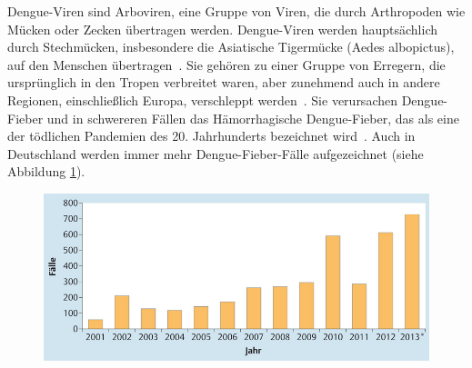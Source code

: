 \documentclass[german,version-2022-01]{uzl-thesis}
\begin{document}
Dengue-Viren sind Arboviren, eine Gruppe von Viren, die durch Arthropoden wie M\"ucken oder Zecken \"ubertragen werden. Dengue-Viren werden haupts\"achlich durch Stechm\"ucken, insbesondere die Asiatische Tigerm\"ucke (Aedes albopictus), auf den Menschen \"ubertragen~\cite{cramer_dengue-virus_2014}. Sie geh\"oren zu einer Gruppe von Erregern, die urspr\"unglich in den Tropen verbreitet waren, aber zunehmend auch in andere Regionen, einschlie\ss{}lich Europa, verschleppt werden~\cite{cramer_dengue-virus_2014}. Sie verursachen Dengue-Fieber und in schwereren F\"allen das H\"amorrhagische Dengue-Fieber, das als eine der t\"odlichen Pandemien des 20. Jahrhunderts bezeichnet wird~\cite{kuhnle_dengue-fieber_1999}. Auch in Deutschland werden immer mehr Dengue-Fieber-F\"alle aufgezeichnet (siehe Abbildung \ref{fig:Dengue_virus_infektionszahlen_deutschland}).\begin{figure}[tbp]
  \centering
  \includegraphics[scale=0.5]{Images/infektionszahlen_dengue_virus_deutschland.jpeg}
  \caption{ \cite{cramer_dengue-virus_2014}}
  \label{fig:Dengue_virus_infektionszahlen_deutschland}

\end{figure}
\end{document}
